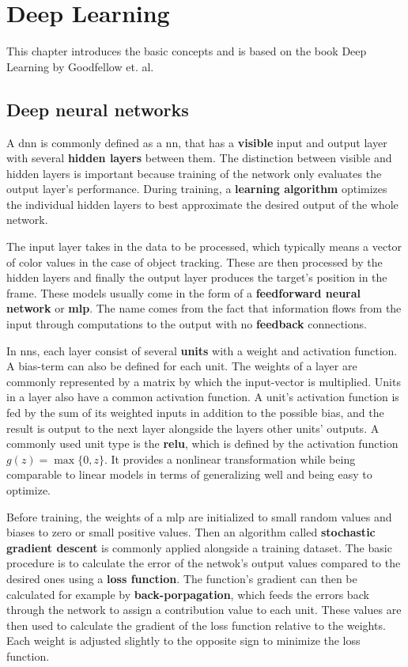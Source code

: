 \section{Deep Learning}

This chapter introduces the basic concepts and is based on the book Deep Learning by
Goodfellow et. al. \cite{DEEP_LEARNING}

\subsection{Deep neural networks}

A \ac{dnn} is commonly defined as a \ac{nn}, that has a \textbf{visible} input and
output layer with several \textbf{hidden layers} between them. The distinction between
visible and hidden layers is important because training of the network only evaluates
the output layer's performance. During training, a \textbf{learning algorithm} optimizes
the individual hidden layers to best approximate the desired output of the whole network.

The input layer takes in the data to be processed, which typically means a vector of
color values in the case of object tracking. These are then processed by the hidden
layers and finally the output layer produces the target's position in the frame. These
models usually come in the form of a \textbf{feedforward neural network} or
\textbf{\ac{mlp}}. The name comes from the fact that information flows from the input
through computations to the output with no \textbf{feedback} connections.

In \ac{nn}s, each layer consist of several \textbf{units} with a weight and activation
function. A bias-term can also be defined for each unit. The weights of a layer are
commonly represented by a matrix by which the input-vector is multiplied. Units in a
layer also have a common activation function. A unit's activation function is fed by
the sum of its weighted inputs in addition to the possible bias, and the result is
output to the next layer alongside the layers other units' outputs. A commonly used
unit type is the \textbf{\ac{relu}}, which is defined by the activation function
$g (z) = \max\{0,z\}$. It provides a nonlinear transformation while being comparable
to linear models in terms of generalizing well and being easy to optimize.

Before training, the weights of a \ac{mlp} are initialized to small random values and 
biases to zero or small positive values. Then an algorithm called \textbf{stochastic
gradient descent} is commonly applied alongside a training dataset. The basic procedure
is to calculate the error of the netwok's output values compared to the desired ones 
using a \textbf{loss function}. The function's gradient can then be calculated for
example by \textbf{back-porpagation}, which feeds the errors back through the network
to assign a contribution value to each unit. These values are then used to calculate
the gradient of the loss function relative to the weights. Each weight is adjusted
slightly to the opposite sign to minimize the loss function.

